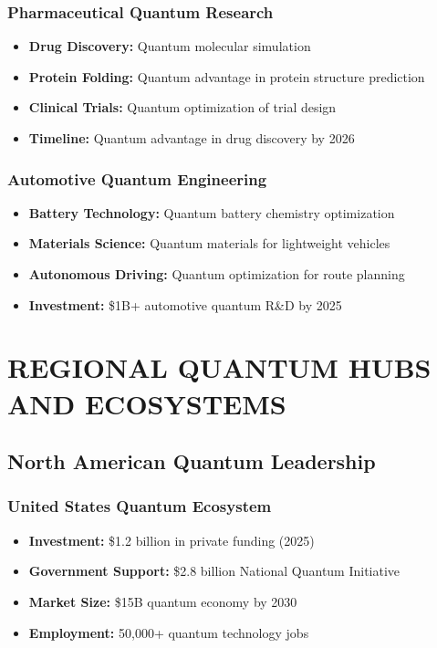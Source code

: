 \documentclass[12pt,a4paper]{article}
\begin{document}
\subsubsection{Pharmaceutical Quantum Research}
\begin{itemize}
    \item \textbf{Drug Discovery:} Quantum molecular simulation
    \item \textbf{Protein Folding:} Quantum advantage in protein structure prediction
    \item \textbf{Clinical Trials:} Quantum optimization of trial design
    \item \textbf{Timeline:} Quantum advantage in drug discovery by 2026
\end{itemize}

\subsubsection{Automotive Quantum Engineering}
\begin{itemize}
    \item \textbf{Battery Technology:} Quantum battery chemistry optimization
    \item \textbf{Materials Science:} Quantum materials for lightweight vehicles
    \item \textbf{Autonomous Driving:} Quantum optimization for route planning
    \item \textbf{Investment:} \$1B+ automotive quantum R\&D by 2025
\end{itemize}

\section{REGIONAL QUANTUM HUBS AND ECOSYSTEMS}

\subsection{North American Quantum Leadership}

\subsubsection{United States Quantum Ecosystem}
\begin{itemize}
    \item \textbf{Investment:} \$1.2 billion in private funding (2025)
    \item \textbf{Government Support:} \$2.8 billion National Quantum Initiative
    \item \textbf{Market Size:} \$15B quantum economy by 2030
    \item \textbf{Employment:} 50,000+ quantum technology jobs
\end{itemize}
\end{document}
